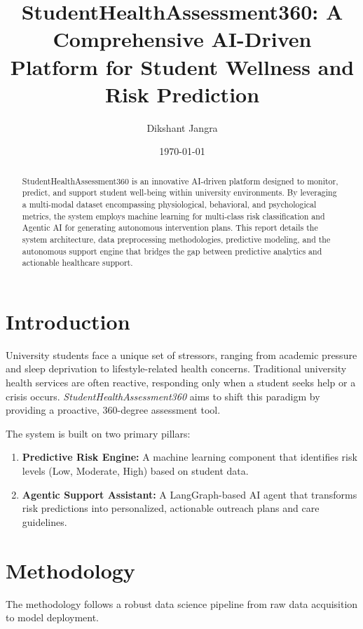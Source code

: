 \documentclass[12pt,a4paper]{article}
\title{\textbf{StudentHealthAssessment360: A Comprehensive AI-Driven Platform for Student Wellness and Risk Prediction}}
\author{Dikshant Jangra}
\date{\today}
\begin{document}
\maketitle

\begin{abstract}
StudentHealthAssessment360 is an innovative AI-driven platform designed to monitor, predict, and support student well-being within university environments. By leveraging a multi-modal dataset encompassing physiological, behavioral, and psychological metrics, the system employs machine learning for multi-class risk classification and Agentic AI for generating autonomous intervention plans. This report details the system architecture, data preprocessing methodologies, predictive modeling, and the autonomous support engine that bridges the gap between predictive analytics and actionable healthcare support.
\end{abstract}

\section{Introduction}
University students face a unique set of stressors, ranging from academic pressure and sleep deprivation to lifestyle-related health concerns. Traditional university health services are often reactive, responding only when a student seeks help or a crisis occurs. \textit{StudentHealthAssessment360} aims to shift this paradigm by providing a proactive, 360-degree assessment tool.

The system is built on two primary pillars:
\begin{enumerate}
    \item \textbf{Predictive Risk Engine:} A machine learning component that identifies risk levels (Low, Moderate, High) based on student data.
    \item \textbf{Agentic Support Assistant:} A LangGraph-based AI agent that transforms risk predictions into personalized, actionable outreach plans and care guidelines.
\end{enumerate}

\section{Methodology}
The methodology follows a robust data science pipeline from raw data acquisition to model deployment.
\end{document}
